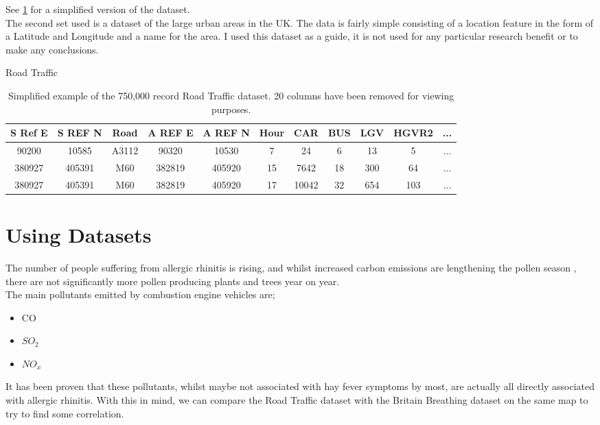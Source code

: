 See \ref{RoadTrafficData} for a simplified version of the dataset.\\

The second set used is a dataset of the large urban areas in the UK. The data is fairly simple consisting of a location feature in the form of a Latitude and Longitude and a name for the area. I used this dataset as a guide, it is not used for any particular research benefit or to make any conclusions.\\


\begin{table}
\begin{center}
Road Traffic\\
\begin{tabular}{|c|c|c|c|c|c|c|c|c|c|c|}\hline\hline
S Ref E&S REF N&Road&A REF E&A REF N&Hour&CAR&BUS&LGV&HGVR2&...\\\hline
90200&10585&A3112&90320&10530&7&24&6&13&5&...\\
380927&405391&M60&382819&405920&15&7642&18&300&64&...\\
380927&405391&M60&382819&405920&17&10042&32&654&103&...\\\hline\hline
\end{tabular}

\caption{Simplified example of the 750,000 record Road Traffic dataset. 20 columns have been removed for viewing purposes.}\label{RoadTrafficData}
\end{center}
\end{table}

\section{Using Datasets}

The number of people suffering from allergic rhinitis is rising\cite{allergyrising}, and whilst increased carbon emissions are lengthening the pollen season \cite{co2pollen}, there are not significantly more pollen producing plants and trees year on year.\\

The main pollutants emitted by combustion engine vehicles are;\cite{vehcemis}

\begin{itemize}
    \item CO
    \item $SO_2$
    \item $NO_x$
\end{itemize}

It has been proven that these pollutants, whilst maybe not associated with hay fever symptoms by most, are actually all directly associated with allergic rhinitis\cite{airPollution}. With this in mind, we can compare the Road Traffic dataset with the Britain Breathing dataset on the same map to try to find some correlation.\\

